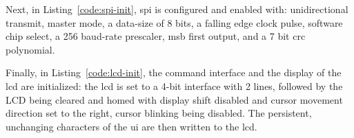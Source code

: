 Next, in Listing~\ref{code:spi-init}, \gls{spi} is configured and
enabled with: unidirectional transmit, master mode, a data-size of 8
bits, a falling edge clock pulse, software chip select, a 256 baud-rate
prescaler, \gls{msb} first output, and a 7 bit \gls{crc} polynomial.


Finally, in Listing~\ref{code:lcd-init}, the command interface and
the display of the \gls{lcd} are initialized: the \gls{lcd} is set to a
4-bit interface with 2 lines, followed by the LCD being cleared and
homed with display shift disabled and cursor movement direction set to
the right, cursor blinking being disabled. The persistent, unchanging
characters of the \gls{ui} are then written to the \gls{lcd}.

